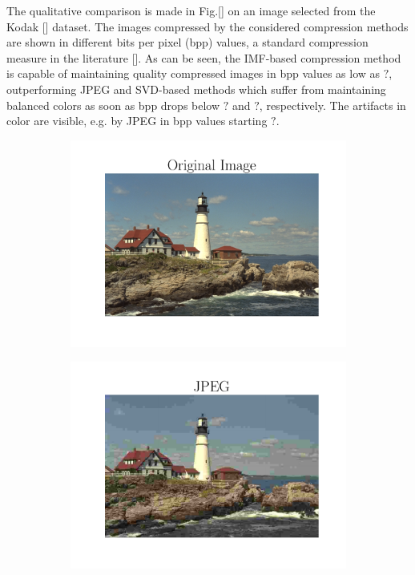 The qualitative comparison is made in Fig.\ref{} on an image selected from the Kodak [] dataset. 
The images compressed by the considered compression methods are shown in different bits per pixel (bpp) values, a standard compression measure in the literature []. 
As can be seen, the IMF-based compression method is capable of maintaining quality compressed images in bpp values as low as $?$, outperforming JPEG and SVD-based methods which suffer from maintaining balanced colors as soon as bpp drops below $?$ and $?$, respectively. 
The artifacts in color are visible, e.g. by JPEG in bpp values starting $?$.
\begin{figure}[t]
	\centering
	\begin{subfigure}{.23\textwidth}
		\centering
        \hspace{-7pt}
		\includegraphics[trim=1.7cm 1cm 1.7cm 1cm, clip, width=1\textwidth]{figures/kodim21_original.pdf}
	\end{subfigure}%
	\begin{subfigure}{.23\textwidth}
		\centering
		\includegraphics[trim=1.7cm 1cm 1.7cm 1cm, clip, width=1\textwidth]{figures/kodim21_JPEG_bpp_0.293.pdf}

\end{subfigure}
\end{figure}
